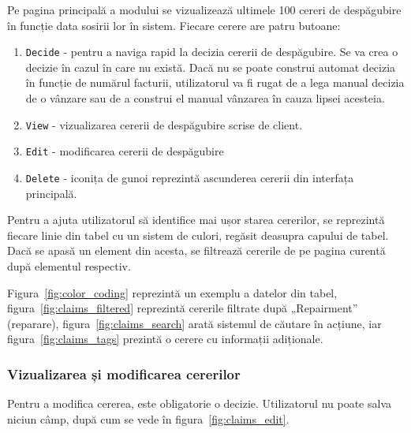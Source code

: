 	Pe pagina principală a modului se vizualizează ultimele 100 cereri de despăgubire în funcție data sosirii lor în sistem.
	Fiecare cerere are patru butoane:
	\begin{enumerate}
		\item \verb|Decide| - pentru a naviga rapid la decizia cererii de despăgubire.
		Se va crea o decizie în cazul în care nu există.
		Dacă nu se poate construi automat decizia în funcție de numărul facturii, utilizatorul va fi rugat de a lega manual decizia de o vânzare sau de a construi el manual vânzarea în cauza lipsei acesteia.
		\item \verb|View| - vizualizarea cererii de despăgubire scrise de client.
		\item \verb|Edit| - modificarea cererii de despăgubire
		\item \verb|Delete| - iconița de gunoi reprezintă ascunderea cererii din interfața principală.

	\end{enumerate}

	Pentru a ajuta utilizatorul să identifice mai ușor starea cererilor, se reprezintă fiecare linie din tabel cu un sistem de culori, regăsit deasupra capului de tabel.
	Dacă se apasă un element din acesta, se filtrează cererile de pe pagina curentă după elementul respectiv.

	Figura~\ref{fig:color_coding} reprezintă un exemplu a datelor din tabel, figura~\ref{fig:claims_filtered} reprezintă cererile filtrate după „Repairment” (reparare), figura~\ref{fig:claims_search} arată sistemul de căutare în acțiune, iar figura~\ref{fig:claims_tags} prezintă o cerere cu informații adiționale.

	\subsubsection{Vizualizarea și modificarea cererilor}

	Pentru a modifica cererea, este obligatorie o decizie.
	Utilizatorul nu poate salva niciun câmp, după cum se vede în figura~\ref{fig:claims_edit}.

